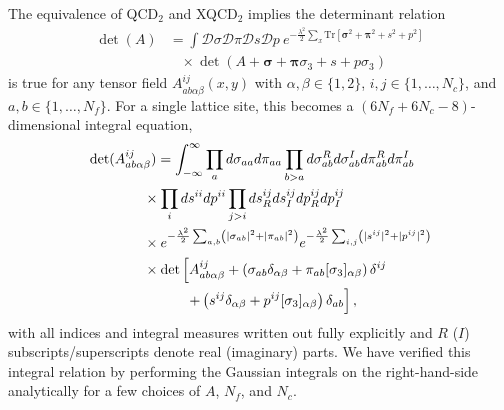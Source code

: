 \documentclass[%
    twocolumn,
superscriptaddress,
preprintnumbers,
nofootinbib,
 amsmath,amssymb,
 aps,
 prd,
 floatfix,
]{revtex4-2}
\begin{document}
The equivalence of QCD$_2$ and XQCD$_2$ implies the determinant relation
\begin{equation}
  \begin{split}
  \det(A) &= \int \mathcal{D}\sigma \mathcal{D}\pi \mathcal{D}s \mathcal{D}p \ e^{-\frac{\lambda^2}{2} \sum_x \text{Tr}[\bm{\sigma}^2+ \bm{\pi}^2 + s^2 + p^2 ]} \\
  &\hspace{10pt} \times \det(A  + \bm{\sigma} + \bm{\pi} \sigma_3  + s + p \sigma_3 )
  \end{split}
\end{equation}
is true for any tensor field $A_{ab\alpha\beta}^{ij}(x,y)$ with $\alpha,\beta \in \{1,2\}$, $i,j\in \{1,\ldots,N_c\}$, and $a,b\in \{1,\ldots,N_f\}$.
For a single lattice site, this becomes a $(6N_f+6N_c - 8)$-dimensional integral equation,
\begin{equation}
  \begin{split}
    &\det(A_{ab\alpha\beta}^{ij}) = \int_{-\infty}^{\infty} \prod_a d\sigma_{aa}d\pi_{aa} \prod_{b>a} d\sigma_{ab}^R d\sigma_{ab}^I d\pi_{ab}^R d\pi_{ab}^I \\ 
    &\hspace{40pt}\times \prod_i ds^{ii}dp^{ii} \prod_{j>i} ds^{ij}_R ds^{ij}_I dp^{ij}_R dp^{ij}_I \\
    &\hspace{40pt} \times  e^{-\frac{\lambda^2}{2} \sum_{a,b} \left( |\sigma_{ab}|^2 + |\pi_{ab}|^2 \right)} e^{-\frac{\lambda^2}{2} \sum_{i,j} \left( |s^{ij}|^2 + |p^{ij}|^2 \right) } \\
    &\hspace{40pt} \times \det\left[A_{ab\alpha\beta}^{ij}  + \left(\sigma_{ab}\delta_{\alpha\beta} + \pi_{ab} [\sigma_3]_{\alpha\beta}\right)\delta^{ij} \right. \\
    &\hspace{70pt} \left. + \left(s^{ij}\delta_{\alpha\beta} + p^{ij} [\sigma_3]_{\alpha\beta}\right)\delta_{ab} \vphantom{A_{ab\alpha\beta}^{ij}}\right],
  \end{split}
\end{equation}
with all indices and integral measures written out fully explicitly and $R$ ($I$) subscripts/superscripts denote real (imaginary) parts.
We have verified this integral relation by performing the Gaussian integrals on the right-hand-side analytically for a few choices of $A$, $N_f$, and $N_c$.
\end{document}
